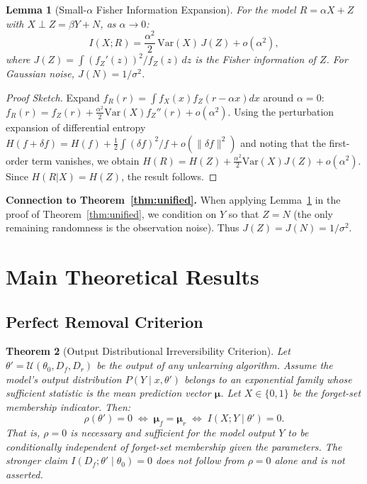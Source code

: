 \documentclass[journal]{IEEEtran}
\newtheorem{theorem}{Theorem}[section]
\newtheorem{lemma}[theorem]{Lemma}
\theoremstyle{definition}
\begin{document}
\begin{lemma}[Small-$\alpha$ Fisher Information Expansion]
\label{lem:fisher}
For the model $R = \alpha X + Z$ with $X \perp Z = \beta Y + N$, as $\alpha \to 0$:
\begin{equation}
I(X; R) = \frac{\alpha^2}{2}\,\mathrm{Var}(X)\,J(Z) + o(\alpha^2),
\end{equation}
where $J(Z) = \int (f_Z'(z))^2/f_Z(z)\,dz$ is the Fisher information of $Z$. For Gaussian noise, $J(N) = 1/\sigma^2$.
\end{lemma}

\begin{proof}[Proof Sketch]
Expand $f_R(r) = \int f_X(x)f_Z(r-\alpha x)dx$ around $\alpha=0$: $f_R(r) = f_Z(r) + \frac{\alpha^2}{2}\mathrm{Var}(X)f_Z''(r) + o(\alpha^2)$. Using the perturbation expansion of differential entropy $H(f+\delta f) = H(f) + \frac{1}{2}\int (\delta f)^2/f + o(\|\delta f\|^2)$ and noting that the first-order term vanishes, we obtain $H(R) = H(Z) + \frac{\alpha^2}{2}\mathrm{Var}(X)J(Z) + o(\alpha^2)$. Since $H(R|X) = H(Z)$, the result follows.
\end{proof}

\textbf{Connection to Theorem~\ref{thm:unified}.} When applying Lemma~\ref{lem:fisher} in the proof of Theorem~\ref{thm:unified}, we condition on $Y$ so that $Z = N$ (the only remaining randomness is the observation noise). Thus $J(Z) = J(N) = 1/\sigma^2$.

\section{Main Theoretical Results}
\label{sec:theory}

\subsection{Perfect Removal Criterion}

\begin{theorem}[Output Distributional Irreversibility Criterion]
\label{thm:perfect}
Let $\theta' = \mathcal{U}(\theta_0, D_f, D_r)$ be the output of any unlearning algorithm. Assume the model's output distribution $P(Y\mid x, \theta')$ belongs to an exponential family whose sufficient statistic is the mean prediction vector $\boldsymbol{\mu}$. Let $X \in \{0,1\}$ be the forget-set membership indicator. Then:
\begin{equation}
\boxed{\rho(\theta') = 0 \;\Longleftrightarrow\; \boldsymbol{\mu}_f = \boldsymbol{\mu}_r \;\Longleftrightarrow\; I(X; Y \mid \theta') = 0.}
\end{equation}
That is, $\rho=0$ is necessary and sufficient for the model output $Y$ to be conditionally independent of forget-set membership given the parameters. The stronger claim $I(D_f; \theta' \mid \theta_0)=0$ does \emph{not} follow from $\rho=0$ alone and is not asserted.
\end{theorem}
\end{document}
